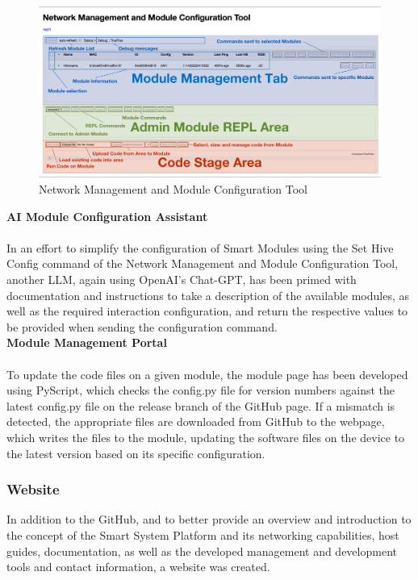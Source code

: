 \begin{figure}[H]
    \centering
    \includegraphics[width=\linewidth]{overleaf/images/nmmct.png}
    \vspace{\ftspace}
    \caption{Network Management and Module Configuration Tool}
    \vspace{\ftspace}
    \label{fig:nmmct}
\end{figure}

\textbf{\label{sec:methods_codeai}AI Module Configuration Assistant}\\\\
In an effort to simplify the configuration of Smart Modules using the Set Hive Config command of the Network Management and Module Configuration Tool, another LLM, again using OpenAI's Chat-GPT, has been primed with documentation and instructions to take a description of the available modules, as well as the required interaction configuration, and return the respective values to be provided when sending the configuration command.\\

\textbf{\label{sec:methods_up}Module Management Portal}\\\\
To update the code files on a given module, the module page has been developed using PyScript, which checks the config.py file for version numbers against the latest config.py file on the release branch of the GitHub page. If a mismatch is detected, the appropriate files are downloaded from GitHub to the webpage, which writes the files to the module, updating the software files on the device to the latest version based on its specific configuration.\\

\subsubsection{\label{sec:methods_website}Website}
In addition to the GitHub, and to better provide an overview and introduction to the concept of the Smart System Platform and its networking capabilities, host guides, documentation, as well as the developed management and development tools and contact information, a website was created.\\

